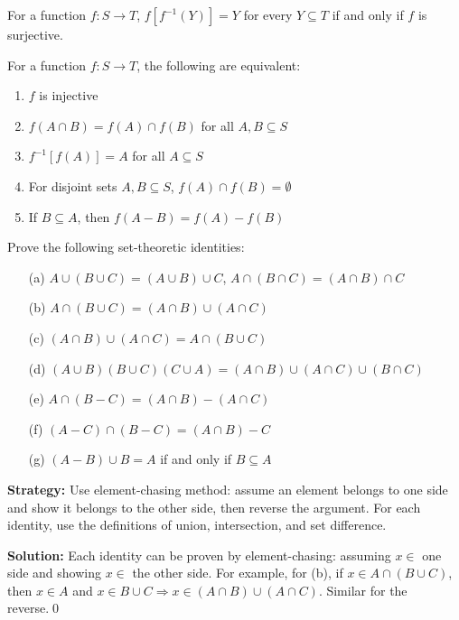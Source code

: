 \begin{theorem}
For a function $f: S \to T$, $f[f^{-1}(Y)] = Y$ for every $Y \subseteq T$ if and only if $f$ is surjective.
\end{theorem}

\begin{theorem}
For a function $f: S \to T$, the following are equivalent:
\begin{enumerate}
\item $f$ is injective
\item $f(A \cap B) = f(A) \cap f(B)$ for all $A, B \subseteq S$
\item $f^{-1}[f(A)] = A$ for all $A \subseteq S$
\item For disjoint sets $A, B \subseteq S$, $f(A) \cap f(B) = \emptyset$
\item If $B \subseteq A$, then $f(A - B) = f(A) - f(B)$
\end{enumerate}
\end{theorem}



\begin{problembox}
Prove the following set-theoretic identities:
\begin{itemize}
\item[(a)] \( A \cup (B \cup C) = (A \cup B) \cup C \), \quad \( A \cap (B \cap C) = (A \cap B) \cap C \)
\item[(b)] \( A \cap (B \cup C) = (A \cap B) \cup (A \cap C) \)
\item[(c)] \( (A \cap B) \cup (A \cap C) = A \cap (B \cup C) \)
\item[(d)] \( (A \cup B)(B \cup C)(C \cup A) = (A \cap B) \cup (A \cap C) \cup (B \cap C) \)
\item[(e)] \( A \cap (B - C) = (A \cap B) - (A \cap C) \)
\item[(f)] \( (A - C) \cap (B - C) = (A \cap B) - C \)
\item[(g)] \( (A - B) \cup B = A \) if and only if \( B \subseteq A \)
\end{itemize}
\end{problembox}

\noindent\textbf{Strategy:} Use element-chasing method: assume an element belongs to one side and show it belongs to the other side, then reverse the argument. For each identity, use the definitions of union, intersection, and set difference.

\bigskip\noindent\textbf{Solution:}  
Each identity can be proven by element-chasing: assuming \( x \in \) one side and showing \( x \in \) the other side.  
For example, for (b), if \( x \in A \cap (B \cup C) \), then \( x \in A \) and \( x \in B \cup C \Rightarrow x \in (A \cap B) \cup (A \cap C) \). Similar for the reverse.\qed




